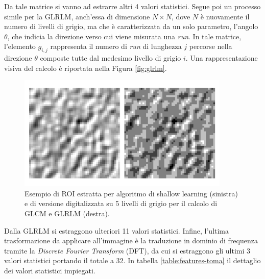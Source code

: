 Da tale matrice si vanno ad estrarre altri 4 valori statistici.
Segue poi un processo simile per la GLRLM, anch'essa di dimensione
$N \times N$, dove $N$ è nuovamente il numero di livelli di grigio,
ma che è caratterizzata da un solo parametro, l'angolo $\theta$,
che indicia la direzione verso cui viene misurata una {\it run}.
In tale matrice, l'elemento $g_{i,j}$ rappresenta il numero di {\it run}
di lunghezza $j$ percorse nella direzione $\theta$ composte tutte dal medesimo
livello di grigio $i$.
Una rappresentazione visiva del calcolo è riportata nella Figura \ref{fig:glrlm}.

\begin{figure}
    \center
    \includegraphics[width=0.9\textwidth]{./assets/roi-shallow.png}
    \caption{\label{fig:roi-shallow} Esempio di ROI estratta per algoritmo di shallow learning (sinistra) e
    di versione digitalizzata su 5 livelli di grigio per il calcolo di GLCM e GLRLM (destra).}
\end{figure}


Dalla GLRLM si estraggono ulteriori 11 valori statistici.
Infine, l'ultima trasformazione da applicare all'immagine è la traduzione in
dominio di frequenza tramite la {\it Discrete Fourier Transform} (DFT), da cui
si estraggono gli ultimi 3 valori statistici portando il totale a 32.
In tabella \ref{table:features-toma} il dettaglio dei valori statistici impiegati.

